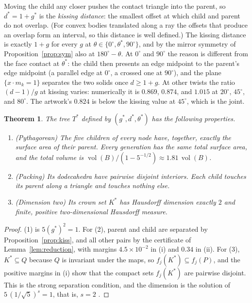 \documentclass[12pt]{article}
\theoremstyle{plain}
\newtheorem{theorem}{Theorem}
\theoremstyle{remark}
\newcommand{\vol}{\operatorname{vol}}
\begin{document}
Moving the child any closer pushes the contact triangle into the parent, so
$d^*=1+g^*$ is the \emph{kissing distance}: the smallest offset at which child
and parent do not overlap.  (For convex bodies translated along a ray the
offsets that produce an overlap form an interval, so this distance is well
defined.)  The kissing distance is exactly $1+g$ for every $g$ at
$\theta\in\{0^\circ,\theta^*,90^\circ\}$, and by the mirror symmetry of
Proposition~\ref{prop:sym} also at $180^\circ-\theta$.  At $0^\circ$ and
$90^\circ$ the reason is different from the face contact at $\theta^*$: the
child then presents an edge midpoint to the parent's edge midpoint (a parallel
edge at $0^\circ$, a crossed one at $90^\circ$), and the plane
$\{x\cdot m_k=1\}$ separates the two solids once $d\ge1+g$.  At other twists
the ratio $(d-1)/g$ at kissing varies: numerically it is $0.869$, $0.874$, and
$1.015$ at $20^\circ$, $45^\circ$, and $80^\circ$.  The artwork's $0.824$ is
below the kissing value at $45^\circ$, which is the joint.

\begin{theorem}\label{thm:pythtree}
The tree $T^*$ defined by $(g^*,d^*,\theta^*)$ has the following properties.
\begin{enumerate}
\item \emph{(Pythagorean)} The five children of every node have, together,
exactly the surface area of their parent.  Every generation has the same total
surface area, and the total volume is $\vol(B)/(1-5^{-1/2})\approx1.81\,\vol(B)$.
\item \emph{(Packing)} Its dodecahedra have pairwise disjoint interiors.  Each
child touches its parent along a triangle and touches nothing else.
\item \emph{(Dimension two)} Its crown set $K^*$ has Hausdorff dimension
exactly $2$ and finite, positive two-dimensional Hausdorff measure.
\end{enumerate}
\end{theorem}

\begin{proof}
(1) is $5(g^*)^2=1$.  For (2), parent and child are separated by
Proposition~\ref{prop:kiss}, and all other pairs by the certificate of
Lemma~\ref{lem:reduction}, with margins $4.5\times10^{-2}$ in (i) and $0.34$ in
(ii).  For (3), $K^*\subseteq Q$ because $Q$ is invariant under the maps, so
$f_j(K^*)\subseteq f_j(P)$, and the positive margins in (i) show that the
compact sets $f_j(K^*)$ are pairwise disjoint.  This is the strong separation
condition, and the dimension is the solution of $5\,(1/\sqrt5)^s=1$, that is,
$s=2$ \cite{Hutchinson1981,Falconer2014}.
\end{proof}
\end{document}
